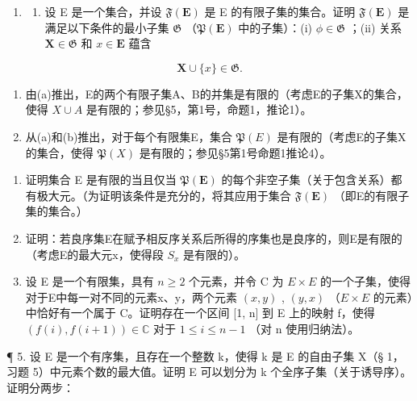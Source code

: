 \exercisegroup

\begin{enumerate}
\def\labelenumi{\arabic{enumi}.}
\tightlist
\item
  \begin{enumerate}
  \def\labelenumii{(\alph{enumii})}
  \tightlist
  \item
    设 E 是一个集合，并设 \(\mathfrak{F}(\mathbf{E})\) 是 E 的有限子集的集合。证明 \(\mathfrak{F}(\mathbf{E})\) 是满足以下条件的最小子集 \(\mathfrak{G}\) （\(\mathfrak{P}(\mathbf{E})\) 中的子集）：(i) \(\phi \in \mathfrak{G}\) ；(ii) 关系 \(\mathbf{X} \in \mathfrak{G}\) 和 \(x \in \mathbf{E}\) 蕴含
  \end{enumerate}
\end{enumerate}

\[
\mathbf {X} \cup \{x \} \in \mathfrak {G}.
\]

\begin{enumerate}
\def\labelenumi{(\alph{enumi})}
\setcounter{enumi}{1}
\item
  由(a)推出，E的两个有限子集A、B的并集是有限的（考虑E的子集X的集合，使得 \(X \cup A\) 是有限的；参见§5，第1号，命题1，推论1）。
\item
  从(a)和(b)推出，对于每个有限集E，集合 \(\mathfrak{P}(E)\) 是有限的（考虑E的子集X的集合，使得 \(\mathfrak{P}(X)\) 是有限的；参见§5第1号命题1推论4）。
\end{enumerate}

\begin{enumerate}
\def\labelenumi{\arabic{enumi}.}
\setcounter{enumi}{1}
\item
  证明集合 E 是有限的当且仅当 \(\mathfrak{P}(\mathbf{E})\) 的每个非空子集（关于包含关系）都有极大元。（为证明该条件是充分的，将其应用于集合 \(\mathfrak{F}(\mathbf{E})\) （即E的有限子集的集合。）
\item
  证明：若良序集E在赋予相反序关系后所得的序集也是良序的，则E是有限的（考虑E的最大元x，使得段 \(S_{x}\) 是有限的）。
\item
  设 E 是一个有限集，具有 \(n \geqslant 2\) 个元素，并令 C 为 \(E \times E\) 的一个子集，使得对于E中每一对不同的元素x、y，两个元素 \((x, y)\) , \((y, x)\) （\(E \times E\) 的元素）中恰好有一个属于 C。证明存在一个区间 {[}1, n{]} 到 E 上的映射 f，使得 \((f(i), f(i+1)) \in \mathbb{C}\) 对于 \(1 \leqslant i \leqslant n - 1\) （对 n 使用归纳法）。
\end{enumerate}

¶ 5. 设 E 是一个有序集，且存在一个整数 k，使得 k 是 E 的自由子集 X（§ 1，习题 5）中元素个数的最大值。证明 E 可以划分为 k 个全序子集（关于诱导序）。证明分两步：

